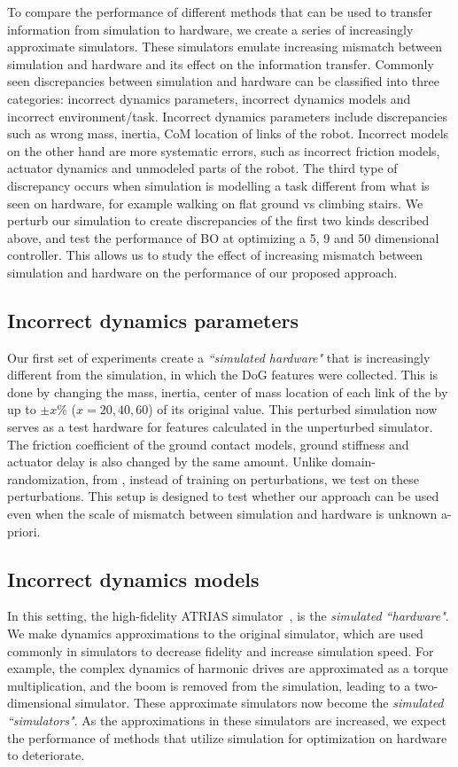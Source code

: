 To compare the performance of different methods that can be used to transfer information from simulation to hardware, we create a series of increasingly approximate simulators. These simulators emulate increasing mismatch between simulation and hardware and its effect on the information transfer. Commonly seen discrepancies between simulation and hardware can be classified into three categories: incorrect dynamics parameters, incorrect dynamics models and incorrect environment/task. Incorrect dynamics parameters include discrepancies such as wrong mass, inertia, CoM location of links of the robot. Incorrect models on the other hand are more systematic errors, such as incorrect friction models, actuator dynamics and unmodeled parts of the robot. The third type of discrepancy occurs when simulation is modelling a task different from what is seen on hardware, for example walking on flat ground vs climbing stairs.  We perturb our simulation to create discrepancies of the first two kinds described above, and test the performance of BO at optimizing a 5, 9 and 50 dimensional controller. This allows us to study the effect of increasing mismatch between simulation and hardware on the performance of our proposed approach.

\subsection{Incorrect dynamics parameters}
Our first set of experiments create a  \textit{``simulated hardware"} that is increasingly different from the simulation, in which the DoG features were collected. This is done by changing the mass, inertia, center of mass location of each link of the  by up to $\pm x\%$ ($x = 20, 40, 60$) of its original value. This perturbed simulation now serves as a test hardware for features calculated in the unperturbed simulator. The friction coefficient of the ground contact models, ground stiffness and actuator delay is also changed by the same amount. 
Unlike domain-randomization, from \cite{mordatch2015ensemble}, instead of training on perturbations, we test on these perturbations. This setup is designed to test whether our approach can be used even when the scale of mismatch between simulation and hardware is unknown a-priori.

\subsection{Incorrect dynamics models}
In this setting, the high-fidelity ATRIAS simulator~\citep{martin2015robust}, is the \textit{simulated ``hardware"}. We make dynamics approximations to the original simulator, which are used commonly in simulators to decrease fidelity and increase simulation speed. For example, the complex dynamics of harmonic drives are approximated as a torque multiplication, and the boom is removed from the simulation, leading to a two-dimensional simulator. These approximate simulators now become the \textit{simulated ``simulators"}. As the approximations in these simulators are increased, we expect the performance of methods that utilize simulation for optimization on hardware to deteriorate.

